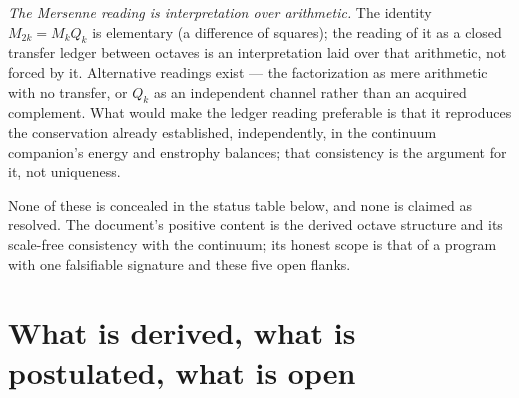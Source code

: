 \documentclass[11pt,a4paper]{article}
\begin{document}
\emph{The Mersenne reading is interpretation over arithmetic.} The identity $M_{2k}=M_kQ_k$ is elementary (a difference of squares); the reading of it as a closed transfer ledger between octaves is an interpretation laid over that arithmetic, not forced by it. Alternative readings exist --- the factorization as mere arithmetic with no transfer, or $Q_k$ as an independent channel rather than an acquired complement. What would make the ledger reading preferable is that it reproduces the conservation already established, independently, in the continuum companion's energy and enstrophy balances; that consistency is the argument for it, not uniqueness.

None of these is concealed in the status table below, and none is claimed as resolved. The document's positive content is the derived octave structure and its scale-free consistency with the continuum; its honest scope is that of a program with one falsifiable signature and these five open flanks.


\section{What is derived, what is postulated, what is open}\label{sec:ledger}
\end{document}
